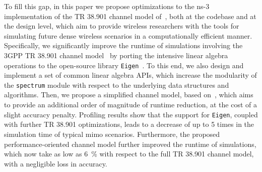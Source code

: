To fill this gap, in this paper we propose optimizations to the ns-3 implementation of the TR 38.901 channel model of~\cite{tommaso:20}, both at the codebase and at the design level, which aim to provide wireless researchers with the tools for simulating future dense wireless scenarios in a computationally efficient manner. Specifically, we significantly improve the runtime of simulations involving the 3GPP TR 38.901 channel model~\cite{TR38901} by porting the intensive linear algebra operations to the open-source library \texttt{Eigen}~\cite{eigenweb}. To this end, we also design and implement a set of common linear algebra APIs, which increase the modularity of the \texttt{spectrum} module with respect to the underlying data structures and algorithms.
Then, we propose a simplified channel model, based on~\cite{TR38901}, which aims to provide an additional order of magnitude of runtime reduction, at the cost of a slight accuracy penalty. Profiling results show that the support for \texttt{Eigen}, coupled with further TR 38.901 optimizations, leads to a decrease of up to 5 times in the simulation time of typical \gls{mimo} scenarios. Furthermore, the proposed performance-oriented channel model further improved the runtime of simulations, which now take as low as $6$~\% with respect to the full TR 38.901 channel model, with a negligible loss in accuracy.